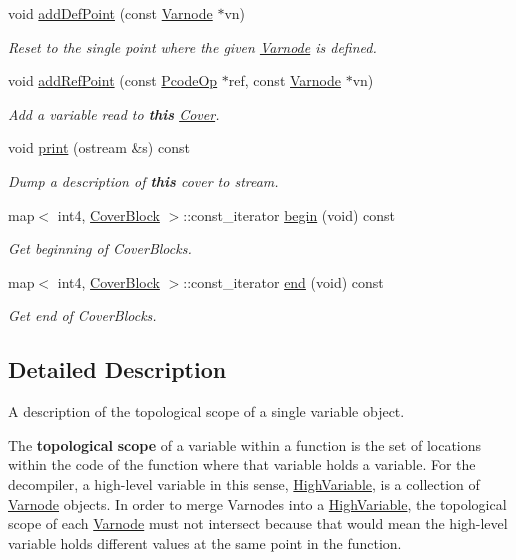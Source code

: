 \begin{DoxyCompactItemize}
void \mbox{\hyperlink{class_cover_a462cc65e034e09963b612d1d3b1faa31}{add\+Def\+Point}} (const \mbox{\hyperlink{class_varnode}{Varnode}} $\ast$vn)
\begin{DoxyCompactList}\small\item\em Reset to the single point where the given \mbox{\hyperlink{class_varnode}{Varnode}} is defined. \end{DoxyCompactList}\item 
void \mbox{\hyperlink{class_cover_ab456608e95995c8005aeac877fdac731}{add\+Ref\+Point}} (const \mbox{\hyperlink{class_pcode_op}{Pcode\+Op}} $\ast$ref, const \mbox{\hyperlink{class_varnode}{Varnode}} $\ast$vn)
\begin{DoxyCompactList}\small\item\em Add a variable read to {\bfseries{this}} \mbox{\hyperlink{class_cover}{Cover}}. \end{DoxyCompactList}\item 
void \mbox{\hyperlink{class_cover_acafb2a8598050f4c282c8df5bd937752}{print}} (ostream \&s) const
\begin{DoxyCompactList}\small\item\em Dump a description of {\bfseries{this}} cover to stream. \end{DoxyCompactList}\item 
map$<$ int4, \mbox{\hyperlink{class_cover_block}{Cover\+Block}} $>$\+::const\+\_\+iterator \mbox{\hyperlink{class_cover_a97eaa891151315273e20d54584001077}{begin}} (void) const
\begin{DoxyCompactList}\small\item\em Get beginning of Cover\+Blocks. \end{DoxyCompactList}\item 
map$<$ int4, \mbox{\hyperlink{class_cover_block}{Cover\+Block}} $>$\+::const\+\_\+iterator \mbox{\hyperlink{class_cover_a6a39c4cbcb8855cbba7d756f09602aa6}{end}} (void) const
\begin{DoxyCompactList}\small\item\em Get end of Cover\+Blocks. \end{DoxyCompactList}\end{DoxyCompactItemize}


\subsection{Detailed Description}
A description of the topological scope of a single variable object. 

The {\bfseries{topological}} {\bfseries{scope}} of a variable within a function is the set of locations within the code of the function where that variable holds a variable. For the decompiler, a high-\/level variable in this sense, \mbox{\hyperlink{class_high_variable}{High\+Variable}}, is a collection of \mbox{\hyperlink{class_varnode}{Varnode}} objects. In order to merge Varnodes into a \mbox{\hyperlink{class_high_variable}{High\+Variable}}, the topological scope of each \mbox{\hyperlink{class_varnode}{Varnode}} must not intersect because that would mean the high-\/level variable holds different values at the same point in the function.

